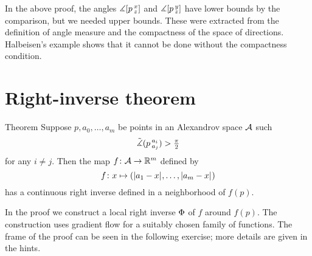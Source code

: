 In the above proof, the angles $\measuredangle[p\,{}^{x}_{z}]$ and $\measuredangle[p\,{}^{y}_{z}]$ have lower bounds by
the comparison, but we needed upper bounds.
These were extracted from the definition of angle measure and the compactness of the space of directions.
Halbeisen's example \cite[13.6]{alexander-kapovitch-petrunin2024} shows that it cannot be done without the compactness condition.

\section{Right-inverse theorem}

\begin{thm}{Theorem}\label{thm:right-inverse}
Suppose $p,a_0,\dots,a_m$ be points in an Alexandrov space $\mathcal{A}$ such
\[\tilde\measuredangle(p\,{}^{a_i}_{a_j})>\tfrac\pi2\]
for any $i\ne j$.
Then the map $f\colon\mathcal{A}\to\mathbb{R}^m$ defined by
\[f\colon x\mapsto (|{a_1}-{x}|_{}^{{}},\dots,|{a_m}-{x}|_{}^{{}})\]
has a  continuous right inverse defined in a neighborhood of $f(p)$.
\end{thm}

In the proof we construct a local right inverse $\Phi$ of $f$ around $f(p)$.
The construction uses gradient flow for a suitably chosen family of functions.
The frame of the proof can be seen in the following exercise;
more details are given in the hints.

